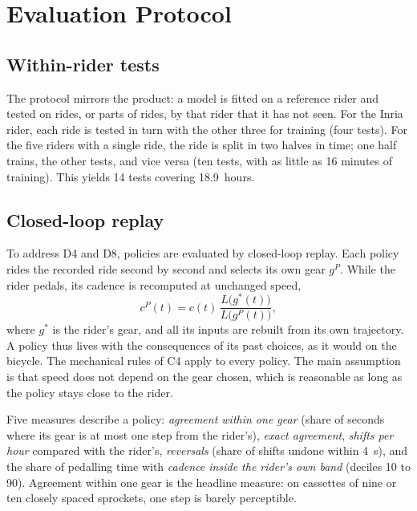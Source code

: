 \documentclass[conference]{IEEEtran}
\begin{document}
\section{Evaluation Protocol}\label{sec:protocol}
\subsection{Within-rider tests}
The protocol mirrors the product: a model is fitted on a reference rider and tested on rides, or parts of rides, by that rider that it has not seen. For the Inria rider, each ride is tested in turn with the other three for training (four tests). For the five riders with a single ride, the ride is split in two halves in time; one half trains, the other tests, and vice versa (ten tests, with as little as 16 minutes of training). This yields 14 tests covering 18.9~hours.

\subsection{Closed-loop replay}
To address D4 and D8, policies are evaluated by closed-loop replay. Each policy rides the recorded ride second by second and selects its own gear $g^P$. While the rider pedals, its cadence is recomputed at unchanged speed,
\begin{equation}
c^P(t) = c(t)\, \frac{L\big(g^*(t)\big)}{L\big(g^P(t)\big)},
\label{eq:replay}
\end{equation}
where $g^*$ is the rider's gear, and all its inputs are rebuilt from its own trajectory. A policy thus lives with the consequences of its past choices, as it would on the bicycle. The mechanical rules of C4 apply to every policy. The main assumption is that speed does not depend on the gear chosen, which is reasonable as long as the policy stays close to the rider.

Five measures describe a policy: \emph{agreement within one gear} (share of seconds where its gear is at most one step from the rider's), \emph{exact agreement}, \emph{shifts per hour} compared with the rider's, \emph{reversals} (share of shifts undone within 4~s), and the share of pedalling time with \emph{cadence inside the rider's own band} (deciles 10 to 90). Agreement within one gear is the headline measure: on cassettes of nine or ten closely spaced sprockets, one step is barely perceptible.
\end{document}
